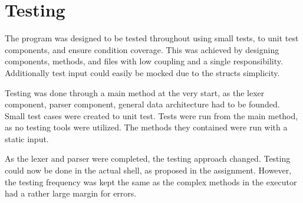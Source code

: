 \section{Testing}
\label{sec:testing}

The program was designed to be tested throughout using small tests, to unit test components, and ensure condition coverage. This was achieved by designing components, methods, and files with low coupling and a single responsibility. Additionally test input could easily be mocked due to the structs simplicity.

Testing was done through a main method at the very start, as the lexer component, parser component, general data architecture had to be founded. Small test cases were created to unit test. Tests were run from the main method, as no testing tools were utilized. The methods they contained were run with a static input.

As the lexer and parser were completed, the testing approach changed. Testing could now be done in the actual shell, as proposed in the assignment. However, the testing frequency was kept the same as the complex methods in the executor had a rather large margin for errors.

